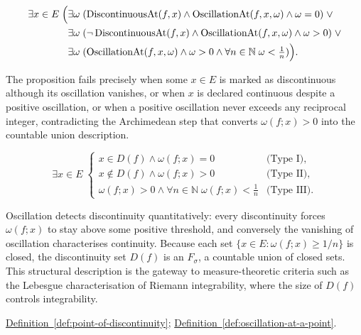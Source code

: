 \begin{remark*}
\[
\begin{aligned}
\exists x\in E\;\Bigl(
&\exists \omega\;(\operatorname{DiscontinuousAt}(f,x)\land \operatorname{OscillationAt}(f,x,\omega)\land \omega=0)\;\lor\\
&\exists \omega\;(\neg\operatorname{DiscontinuousAt}(f,x)\land \operatorname{OscillationAt}(f,x,\omega)\land \omega>0)\;\lor\\
&\exists \omega\;(\operatorname{OscillationAt}(f,x,\omega)\land \omega>0\land \forall n\in\mathbb{N}\; \omega<\tfrac1n)
\Bigr).
\end{aligned}
\]
\end{remark*}

\begin{remark*}
The proposition fails precisely when some $x\in E$ is marked as discontinuous although its oscillation vanishes, or when $x$ is declared continuous despite a positive oscillation, or when a positive oscillation never exceeds any reciprocal integer, contradicting the Archimedean step that converts $\omega(f;x)>0$ into the countable union description.
\end{remark*}

\begin{remark*}
\[
\exists x\in E\;
\begin{cases}
x\in D(f)\land \omega(f;x)=0 & \text{(Type I)},\\[4pt]
x\notin D(f)\land \omega(f;x)>0 & \text{(Type II)},\\[4pt]
\omega(f;x)>0\land \forall n\in\mathbb{N}\; \omega(f;x)<\tfrac1n & \text{(Type III)}.
\end{cases}
\]
\end{remark*}

\begin{remark*}[Interpretation]
Oscillation detects discontinuity quantitatively: every discontinuity forces $\omega(f;x)$ to stay above some positive threshold, and conversely the vanishing of oscillation characterises continuity. Because each set $\{x\in E:\omega(f;x)\ge 1/n\}$ is closed, the discontinuity set $D(f)$ is an $F_{\sigma}$, a countable union of closed sets. This structural description is the gateway to measure-theoretic criteria such as the Lebesgue characterisation of Riemann integrability, where the size of $D(f)$ controls integrability.
\end{remark*}

\begin{dependencies}
\hyperref[def:point-of-discontinuity]{Definition~\ref*{def:point-of-discontinuity}};
\hyperref[def:oscillation-at-a-point]{Definition~\ref*{def:oscillation-at-a-point}}.
\end{dependencies}
